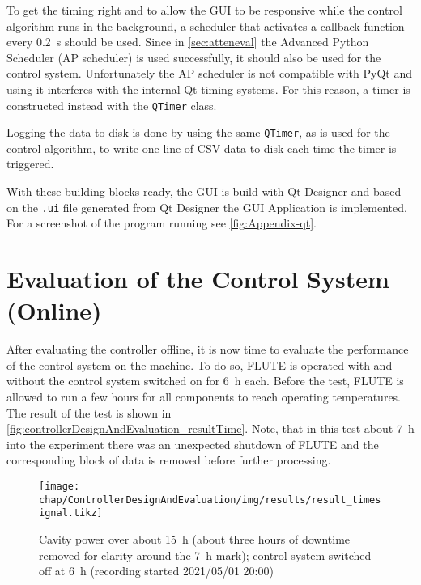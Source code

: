 To get the timing right and to allow the GUI to be responsive while the control algorithm runs in the background, a scheduler that activates a callback function every \SI{0.2}{\second} should be used. Since in \autoref{sec:atteneval} the Advanced Python Scheduler (AP scheduler) is used successfully, it should also be used for the control system. Unfortunately the AP scheduler is not compatible with PyQt and using it interferes with the internal Qt timing systems. For this reason, a timer is constructed instead with the  \texttt{QTimer} class.\cite{qtimer}

Logging the data to disk is done by using the same \texttt{QTimer}, as is used for the control algorithm, to write one line of CSV data to disk each time the timer is triggered.

With these building blocks ready, the GUI is build with Qt Designer and based on the \texttt{.ui} file generated from Qt Designer the GUI Application is implemented. For a screenshot of the program running see \autoref{fig:Appendix-qt}.









\newpage
\section{Evaluation of the Control System (Online)}
After evaluating the controller offline, it is now time to evaluate the performance of the control system on the machine. To do so, FLUTE is operated with and without the control system switched on for \SI{6}{\hour} each. Before the test, FLUTE is allowed to run a few hours for all components to reach operating temperatures.
The result of the test is shown in \autoref{fig:controllerDesignAndEvaluation_resultTime}.
Note, that in this test about \SI{7}{\hour} into the experiment there was an unexpected shutdown of FLUTE and the corresponding block of data is removed before further processing.

\begin{figure}[tb]
	\centering
	\texttt{[image: chap/ControllerDesignAndEvaluation/img/results/result\_timesignal.tikz]}
	\caption{Cavity power over about \SI{15}{\hour} (about three hours of downtime removed for clarity around the \SI{7}{\hour} mark); control system switched off at \SI{6}{\hour} (recording started 2021/05/01 20:00)}
	\label{fig:controllerDesignAndEvaluation_resultTime}
\end{figure}

